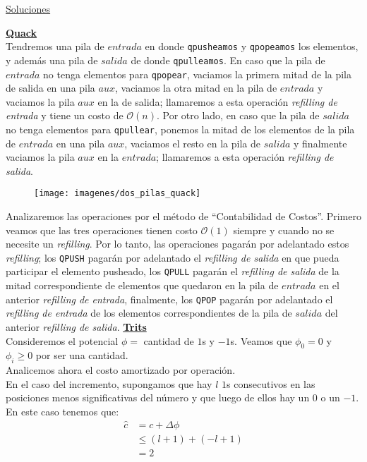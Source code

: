 \documentclass[dcc,uchile]{fcfmcourse}
\theoremstyle{plain}
\theoremstyle{definition}
\begin{document}
\newpage
\begin{center}
{\huge \underline{Soluciones}}
\end{center}
\begin{problems}
\problem \underline{\textbf{Quack}}\\
Tendremos una pila de $entrada$ en donde \texttt{qpusheamos} y \texttt{qpopeamos} los elementos, y además una pila de $salida$ de donde \texttt{qpulleamos}. En caso que la pila de $entrada$ no tenga elementos para \texttt{qpopear}, vaciamos la primera mitad de la pila de salida en una pila $aux$, vaciamos la otra mitad en la pila de $entrada$ y vaciamos la pila $aux$ en la de salida; llamaremos a esta operación \textit{refilling de entrada} y tiene un costo de $\mathcal{O}(n)$. Por otro lado, en caso que la pila de $salida$ no tenga elementos para \texttt{qpullear}, ponemos la mitad de los elementos de la pila de $entrada$ en una pila $aux$, vaciamos el resto en la pila de $salida$ y finalmente vaciamos la pila $aux$ en la $entrada$; llamaremos a esta operación \textit{refilling de salida}.
\begin{figure}[h]
    \centering
    \texttt{[image: imagenes/dos\_pilas\_quack]}
\end{figure}

Analizaremos las operaciones por el método de ``Contabilidad de Costos''. Primero veamos que las tres operaciones tienen costo $\mathcal{O}(1)$ siempre y cuando no se necesite un \textit{refilling}. Por lo tanto, las operaciones pagarán por adelantado estos \textit{refilling}; los \texttt{QPUSH} pagarán por adelantado el \textit{refilling de salida} en que pueda participar el elemento pusheado, los \texttt{QPULL} pagarán el \textit{refilling de salida} de la mitad correspondiente de elementos que quedaron en la pila de $entrada$ en el anterior \textit{refilling de entrada}, finalmente, los \texttt{QPOP} pagarán por adelantado el \textit{refilling de entrada} de los elementos correspondientes de la pila de $salida$ del anterior \textit{refilling de salida}.
\problem \underline{\textbf{Trits}}\\
Consideremos el potencial $\phi = $ cantidad de $1$s y $-1$s. Veamos que $\phi_0 = 0$ y $\phi_i \ge 0$ por ser una cantidad.\\
Analicemos ahora el costo amortizado por operación.\\

En el caso del incremento, supongamos que hay $l$ $1$s consecutivos en las posiciones menos significativas del número y que luego de ellos hay un $0$ o un $-1$. En este caso tenemos que:
\begin{align*}
    \hat{c} &= c + \Delta \phi \\
    &\le (l+1) + (-l + 1)\\
    &= 2
\end{align*}


\end{problems}
\end{document}
